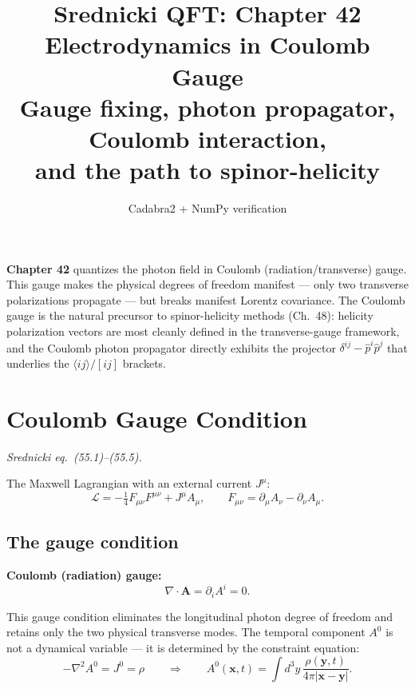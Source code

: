 \documentclass[12pt]{article}
\title{\textbf{Srednicki QFT: Chapter 42}\\[6pt]
       \large Electrodynamics in Coulomb Gauge\\[4pt]
       \normalsize Gauge fixing, photon propagator, Coulomb interaction,\\
       and the path to spinor-helicity}
\author{Cadabra2 + NumPy verification}
\date{}
\begin{document}
\maketitle
\tableofcontents
\newpage

\begin{mdframed}[backgroundcolor=blue!5]
\textbf{Chapter 42} quantizes the photon field in Coulomb (radiation/transverse) gauge.
This gauge makes the physical degrees of freedom manifest --- only two transverse
polarizations propagate --- but breaks manifest Lorentz covariance.  The Coulomb gauge
is the natural precursor to spinor-helicity methods (Ch.~48): helicity polarization
vectors are most cleanly defined in the transverse-gauge framework, and the
Coulomb photon propagator directly exhibits the projector
$\delta^{ij} - \hat p^i\hat p^j$ that underlies the $\langle ij\rangle/[ij]$ brackets.
\end{mdframed}

\section{Coulomb Gauge Condition}

\textit{Srednicki eq.\ (55.1)--(55.5).}

The Maxwell Lagrangian with an external current $J^\mu$:
\begin{equation}\label{eq:maxwell-lag}
  \mathcal{L} = -\tfrac{1}{4}F_{\mu\nu}F^{\mu\nu} + J^\mu A_\mu,
  \qquad F_{\mu\nu} = \partial_\mu A_\nu - \partial_\nu A_\mu.
\end{equation}

\subsection{The gauge condition}

\begin{mdframed}[backgroundcolor=blue!5]
\textbf{Coulomb (radiation) gauge:}
\begin{equation}\label{eq:coulomb-cond}
  \nabla\cdot\mathbf{A} = \partial_i A^i = 0.
\end{equation}
\end{mdframed}

This gauge condition eliminates the longitudinal photon degree of freedom and
retains only the two physical transverse modes.  The temporal component $A^0$ is
not a dynamical variable --- it is determined by the constraint equation:
\begin{equation}\label{eq:coulomb-A0}
  -\nabla^2 A^0 = J^0 = \rho \qquad \Rightarrow \qquad
  A^0(\mathbf{x},t) = \int d^3y\,\frac{\rho(\mathbf{y},t)}{4\pi|\mathbf{x}-\mathbf{y}|}.
\end{equation}
\end{document}
